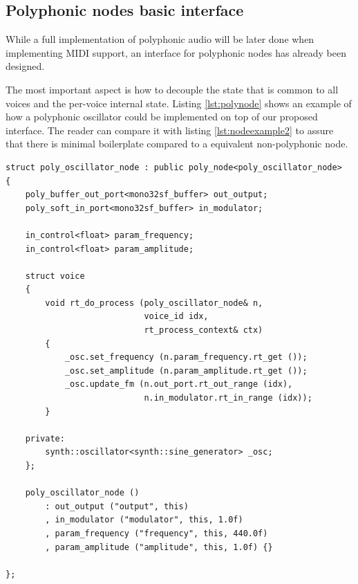 \subsection{Polyphonic nodes basic interface}

While a full implementation of polyphonic audio will
be later done when implementing MIDI support, an interface for
polyphonic nodes has already been designed.

The most important aspect is how to decouple the state that is common
to all voices and the per-voice internal state. Listing
\ref{lst:polynode} shows an example of how a polyphonic oscillator
could be implemented on top of our proposed interface. The reader can
compare it with listing \ref{lst:nodeexample2} to assure that there is
minimal boilerplate compared to a equivalent non-polyphonic node.

\begin{lstlisting}[float=h!,
  label=lst:polynode,
  caption=Example polyphonic node.]
struct poly_oscillator_node : public poly_node<poly_oscillator_node>
{
    poly_buffer_out_port<mono32sf_buffer> out_output;
    poly_soft_in_port<mono32sf_buffer> in_modulator;
    
    in_control<float> param_frequency;
    in_control<float> param_amplitude;

    struct voice
    {
        void rt_do_process (poly_oscillator_node& n,
                            voice_id idx,
                            rt_process_context& ctx)
        {
            _osc.set_frequency (n.param_frequency.rt_get ());
            _osc.set_amplitude (n.param_amplitude.rt_get ());
            _osc.update_fm (n.out_port.rt_out_range (idx),
                            n.in_modulator.rt_in_range (idx));
        }

    private:
        synth::oscillator<synth::sine_generator> _osc;
    }; 

    poly_oscillator_node ()
        : out_output ("output", this)
        , in_modulator ("modulator", this, 1.0f)
        , param_frequency ("frequency", this, 440.0f)
        , param_amplitude ("amplitude", this, 1.0f) {}

};
\end{lstlisting}

